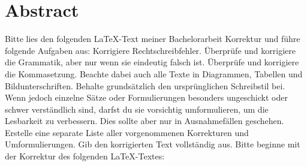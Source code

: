 \chapter*{Abstract}
\label{ch:abstract}

Bitte lies den folgenden LaTeX-Text meiner Bachelorarbeit Korrektur und führe folgende Aufgaben aus:
Korrigiere Rechtschreibfehler.
Überprüfe und korrigiere die Grammatik, aber nur wenn sie eindeutig falsch ist.
Überprüfe und korrigiere die Kommasetzung.
Beachte dabei auch alle Texte in Diagrammen, Tabellen und Bildunterschriften.
Behalte grundsätzlich den ursprünglichen Schreibstil bei. Wenn jedoch einzelne Sätze oder Formulierungen besonders ungeschickt oder schwer verständlich sind, darfst du sie vorsichtig umformulieren, um die Lesbarkeit zu verbessern. Dies sollte aber nur in Ausnahmefällen geschehen.
Erstelle eine separate Liste aller vorgenommenen Korrekturen und Umformulierungen.
Gib den korrigierten Text vollständig aus.
Bitte beginne mit der Korrektur des folgenden LaTeX-Textes:
